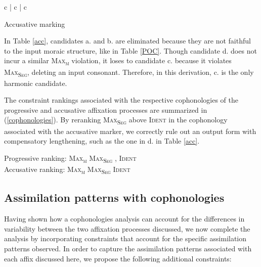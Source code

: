 \documentclass[output=paper]{langscibook}
\begin{document}
\begin{table}
\ShadingOn
\begin{tableau}{c | c | c}
              
         \vio{*!}                                    \vio{*}                                         \vio{}
         \vio{*!}                                    \vio{*}                                         \vio{}
 \vio{}                                   \vio{*}                                          \vio{}
  \vio{}                                  \vio{*!}                                         \vio{}
\end{tableau}
\caption{Accusative marking} \label{acc}
\end{table}

In Table \ref{acc}, candidates a. and b. are eliminated because they are not faithful to the input moraic structure, like in Table \ref{POC}. Though candidate d. does not incur a similar \textsc{Max\textsubscript{μ}} violation, it loses to candidate c. because it violates \textsc{Max\textsubscript{Seg}}, deleting an input consonant. Therefore, in this derivation, c. is the only harmonic candidate.

\begin{sloppypar}
The constraint rankings associated with the respective cophonologies of the progressive and accusative affixation processes are summarized in (\ref{cophonologies}). By reranking \textsc{Max\textsubscript{Seg}} above \textsc{Ident} in the cophonology associated with the accusative marker, we correctly rule out an output form with compensatory lengthening, such as the one in d. in Table \ref{acc}.
\end{sloppypar}

\ea \label{cophonologies}

Progressive ranking: \textsc{Max\textsubscript{μ}} \guillemotright  \textsc{Max\textsubscript{Seg}} , \textsc{Ident}\\
Accusative ranking: \textsc{Max\textsubscript{μ}} \guillemotright  \textsc{Max\textsubscript{Seg}} \guillemotright \textsc{Ident}
 
\z


\subsection{Assimilation patterns with cophonologies}
Having shown how a cophonologies analysis can account for the differences in variability between the two affixation processes discussed, we now complete the analysis by incorporating constraints that account for the specific assimilation patterns observed. In order to capture the assimilation patterns associated with each affix discussed here, we propose the following additional constraints:
\end{document}
